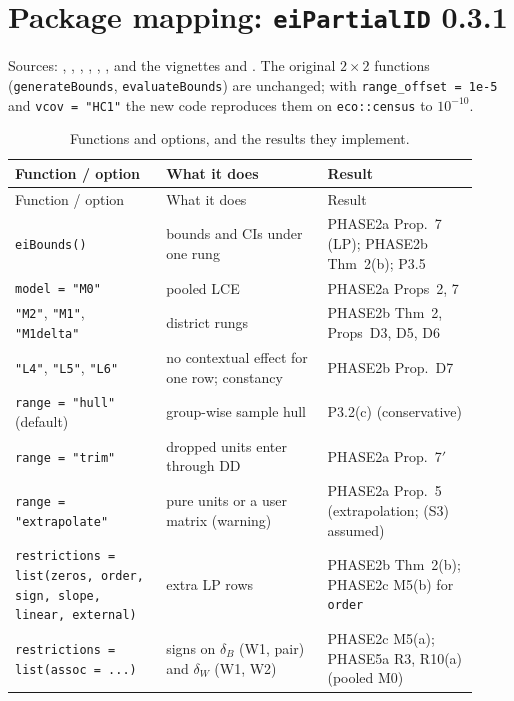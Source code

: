 \section{Package mapping: \texttt{eiPartialID} 0.3.1}\label{sec:package}

Sources: , ,
, , ,
, and the vignettes  and
. The original $2\times2$ functions
(\texttt{generateBounds}, \texttt{evaluateBounds}) are unchanged; with
\texttt{range\_offset = 1e-5} and \texttt{vcov = "HC1"} the new code reproduces
them on \texttt{eco::census} to $10^{-10}$.

\begin{longtable}{@{}L{0.30\linewidth}L{0.32\linewidth}L{0.30\linewidth}@{}}
\caption{Functions and options, and the results they implement.}\label{tab:package}\\
\toprule Function / option & What it does & Result \\ \midrule\endfirsthead
\toprule Function / option & What it does & Result \\ \midrule\endhead
\texttt{eiBounds()} & bounds and CIs under one rung & PHASE2a Prop.~7 (LP); PHASE2b Thm~2(b); P3.5 \\
\texttt{model = "M0"} & pooled LCE & PHASE2a Props~2, 7 \\
\texttt{"M2"}, \texttt{"M1"}, \texttt{"M1delta"} & district rungs & PHASE2b Thm~2, Props~D3, D5, D6 \\
\texttt{"L4"}, \texttt{"L5"}, \texttt{"L6"} & no contextual effect for one row; constancy & PHASE2b Prop.~D7 \\
\texttt{range = "hull"} (default) & group-wise sample hull & P3.2(c) (conservative) \\
\texttt{range = "trim"} & dropped units enter through DD & PHASE2a Prop.~7$'$ \\
\texttt{range = "extrapolate"} & pure units or a user matrix (warning) & PHASE2a Prop.~5 (extrapolation; (S3) assumed) \\
\texttt{restrictions = list(zeros, order, sign, slope, linear, external)} & extra LP rows & PHASE2b Thm~2(b); PHASE2c M5(b) for \texttt{order} \\
\texttt{restrictions = list(assoc = ...)} & signs on $\delta_B$ (W1, pair) and $\delta_W$ (W1, W2) & PHASE2c M5(a); PHASE5a R3, R10(a) (pooled M0) \\

\end{longtable}
